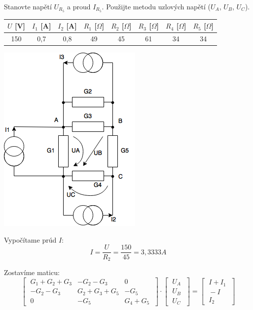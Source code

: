 \documentclass[a4paper,11pt,titlepage]{article}
\begin{document}
Stanovte napětí $U_{R_5}$ a proud $I_{R_5}$. Použijte metodu uzlových napětí ($U_A$, $U_B$, $U_C$).

\vspace{5mm}

\begin{tabular}{ |c|c|c|c|c|c|c|c| } \hline
    $U$ [V] & $I_1$ [A] & $I_2$ [A] & $R_1$ [$\Omega$] & $R_2$ [$\Omega$] & $R_3$ [$\Omega$] & $R_4$ [$\Omega$] & $R_5$ [$\Omega$] \\ \hline
    150 & 0,7 & 0,8 & 49 & 45 & 61 & 34 & 34 \\ \hline
\end{tabular}

\vspace{5mm}

\includegraphics[scale=0.5]{diagr.png}

\vspace{5mm}

Vypočítame prúd $I$:
\[I = \frac{U}{R_2} = \frac{150}{45} = 3,3333A\]

\vspace{5mm}

Zostavíme maticu:
$$
\begin{bmatrix}
  \; {G_1 + G_2 + G_3} & {-G_2 - G_3} & {0} \; \\
  \; {-G_2 - G_3} & {G_2 + G_3 + G_5} & {-G_5} \; \\
  \; {0} & {-G_5} & {G_4 + G_5} \;
\end{bmatrix} 
\cdot
\begin{bmatrix}
  \; U_A \; \\
  \; U_B \; \\
  \; U_C \;
\end{bmatrix} =
\begin{bmatrix}
  \; I + I_1 \; \\
  \; -I \; \\
  \; I_2 \;
\end{bmatrix} 
$$
\end{document}
